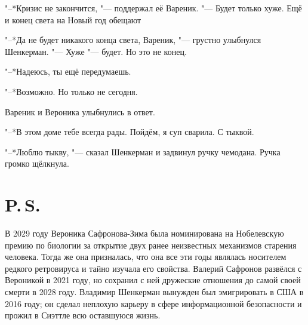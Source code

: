 "--*Кризис не закончится, "--- поддержал её Вареник.
"--- Будет только хуже.
Ещё и конец света на Новый год обещают\ldotst

"--*Да не будет никакого конца света, Вареник, "--- грустно улыбнулся Шенкерман.
"--- Хуже "--- будет.
Но это не конец.

"--*Надеюсь, ты ещё передумаешь.

"--*Возможно.
Но только не сегодня.

Вареник и Вероника улыбнулись в ответ.

"--*В этом доме тебе всегда рады.
Пойдём, я суп сварила.
С тыквой.

"--*Люблю тыкву, "--- сказал Шенкерман и задвинул ручку чемодана.
Ручка громко щёлкнула.

\section{P.\,S.}

В 2029 году Вероника Сафронова-Зима была номинирована на Нобелевскую премию по биологии за открытие двух ранее неизвестных механизмов старения человека.
Тогда же она призналась, что она все эти годы являлась носителем редкого ретровируса и тайно изучала его свойства.
Валерий Сафронов развёлся с Вероникой в 2021 году, но сохранил с ней дружеские отношения до самой своей смерти в 2028 году.
Владимир Шенкерман вынужден был эмигрировать в США в 2016 году;
он сделал неплохую карьеру в сфере информационной безопасности и прожил в Сиэттле всю оставшуюся жизнь.
